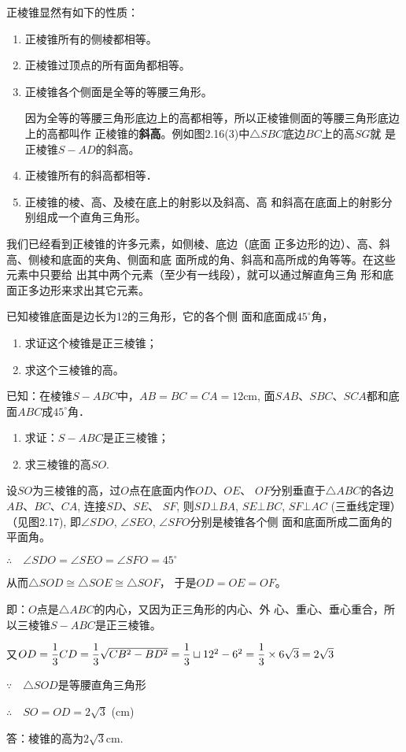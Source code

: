正棱锥显然有如下的性质：
\begin{enumerate}
\item 正棱锥所有的侧棱都相等。
\item 正棱锥过顶点的所有面角都相等。
\item 正棱锥各个侧面是全等的等腰三角形。

因为全等的等腰三角形底边上的高都相等，所以正棱锥侧面的等腰三角形底边上的高都叫作
正棱锥的\textbf{斜高}。例如图2.16(3)中$\triangle SBC$底边$BC$上的高$SG$就
是正棱锥$S-AD$的斜高。
\item 正棱锥所有的斜高都相等．
\item 正棱锥的棱、高、及棱在底上的射影以及斜高、高
和斜高在底面上的射影分别组成一个直角三角形。
\end{enumerate}

我们已经看到正棱锥的许多元素，如侧棱、底边（底面
正多边形的边）、高、斜高、侧棱和底面的夹角、侧面和底
面所成的角、斜高和高所成的角等等。在这些元素中只要给
出其中两个元素（至少有一线段），就可以通过解直角三角
形和底面正多边形来求出其它元素。

\begin{example}
已知棱锥底面是边长为12的三角形，它的各个侧
面和底面成$45^{\circ}$角，
\begin{enumerate}
    \item 求证这个棱锥是正三棱锥；
    \item 求这个三棱锥的高。
\end{enumerate}

已知：在棱锥$S-ABC$中，$AB=BC=CA=12$cm, 
面$SAB$、$SBC$、$SCA$都和底面$ABC$成$45^{\circ}$角．
\begin{enumerate}
    \item 求证：$S-ABC$是正三棱锥；
    \item 求三棱锥的高$SO$.
\end{enumerate}
\end{example}

\begin{solution}
    设$SO$为三棱锥的高，过$O$点在底面内作$OD$、$OE$、
$OF$分别垂直于$\triangle ABC$的各边$AB$、$BC$、$CA$, 连接$SD$、$SE$、
$SF$, 则$SD\bot BA$, $SE\bot BC$, $SF\bot AC$ (三垂线定理）（见图2.17), 即$\angle SDO$, $\angle SEO$, $\angle SFO$分别是棱锥各个侧
面和底面所成二面角的平面角。

$\therefore\quad \angle SDO=\angle SEO=\angle SFO=45^{\circ}$

从而$\triangle SOD\cong \triangle SOE\cong \triangle SOF$，
于是$OD=OE=OF$。

即：$O$点是$\triangle ABC$的内心，又因为正三角形的内心、外
心、重心、垂心重合，所以三棱锥$S-ABC$是正三棱锥。

又$OD=\dfrac{1}{3}CD=\dfrac{1}{3}\sqrt{CB^2-BD^2}=\dfrac{1}{3}\sqcup12^2-6^2=\dfrac{1}{3}\times 6\sqrt{3}=2\sqrt{3}$

$\because\quad \triangle SOD$是等腰直角三角形

$\therefore\quad SO=OD=2\sqrt{3}$ (cm)

答：棱锥的高为$2\sqrt{3}$cm.
\end{solution}

